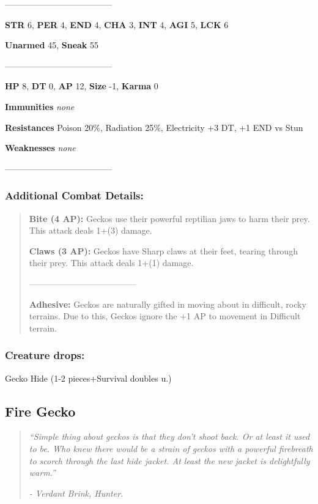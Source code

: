 \documentclass[11pt,a4paper,twocolumn]{book}
\begin{document}
	--------------------------------------

	\noindent
	\textbf{STR} 6, \textbf{PER} 4, \textbf{END} 4, \textbf{CHA} 3, \textbf{INT} 4, \textbf{AGI} 5, \textbf{LCK} 6
	
	\noindent
	\textbf{Unarmed} 45, \textbf{Sneak} 55
	
	--------------------------------------
	
	\noindent
	\textbf{HP} 8, \textbf{DT} 0, \textbf{AP} 12, \textbf{Size} -1, \textbf{Karma} 0
	
	
	\noindent
	\textbf{Immunities} \emph{none} %
	
	\noindent
	\textbf{Resistances} Poison 20\%, Radiation 25\%, Electricity +3 DT, +1 END vs Stun %
	
	\noindent
	\textbf{Weaknesses} \emph{none} %
	
	--------------------------------------
	
	\subsubsection*{Additional Combat Details:}
	\begin{verse}
		\textbf{Bite (4 AP):} Geckos use their powerful reptilian jaws to harm their prey. This attack deals 1+(3) damage.
		
		\textbf{Claws (3 AP):} Geckos have Sharp claws at their feet, tearing through their prey. This attack deals 1+(1) damage.  
		
		--------------------------------------
		
		\textbf{Adhesive:} Geckos are naturally gifted in moving about in difficult, rocky terrains. Due to this, Geckos ignore the +1 AP to movement in Difficult terrain.
		
	\end{verse}
	
	\subsubsection*{Creature drops:}
	Gecko Hide (1-2 pieces+Survival doubles u.)
	
	\vfill
	\subsection*{Fire Gecko}
	\begin{quote}
		\emph{``Simple thing about geckos is that they don't shoot back. Or at least it used to be. Who knew there would be a strain of geckos with a powerful firebreath to scorch through the last hide jacket. At least the new jacket is delightfully warm.''}
		
		\emph{- Verdant Brink, Hunter.}
	\end{quote}
	
\end{document}
